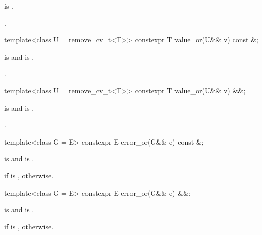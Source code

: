 \begin{itemdescr}
\pnum
\hardexpects
{} is .

\pnum
\returns
{}.
\end{itemdescr}

%
\begin{itemdecl}
template<class U = remove_cv_t<T>> constexpr T value_or(U&& v) const &;
\end{itemdecl}

\begin{itemdescr}
\pnum
\mandates
{} is  and
 is .

\pnum
\returns
{}.
\end{itemdescr}

%
\begin{itemdecl}
template<class U = remove_cv_t<T>> constexpr T value_or(U&& v) &&;
\end{itemdecl}

\begin{itemdescr}
\pnum
\mandates
{} is  and
 is .

\pnum
\returns
{}.
\end{itemdescr}

%
\begin{itemdecl}
template<class G = E> constexpr E error_or(G&& e) const &;
\end{itemdecl}

\begin{itemdescr}
\pnum
\mandates
{} is  and
 is .

\pnum
\returns
{} if  is ,
 otherwise.
\end{itemdescr}

%
\begin{itemdecl}
template<class G = E> constexpr E error_or(G&& e) &&;
\end{itemdecl}

\begin{itemdescr}
\pnum
\mandates
{} is  and
 is .

\pnum
\returns
{} if  is ,
 otherwise.
\end{itemdescr}

